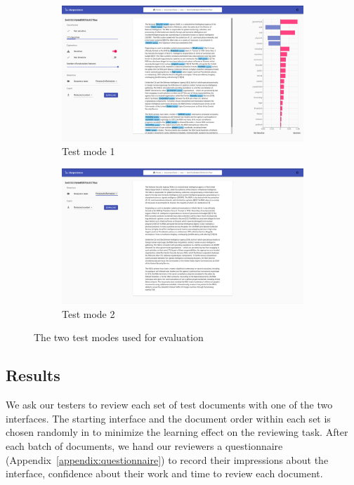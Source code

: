 \documentclass[\version]{l4proj}
\begin{document}
\begin{figure}[H]
    \centering
    \begin{subfigure}[c]{0.49\textwidth}
        \centering
        \includegraphics[width=\textwidth]{images/ui_test_mode_1.png}
        \caption{Test mode 1}\label{fig:test-mode-1}
    \end{subfigure}
    \begin{subfigure}[c]{0.49\textwidth}
        \centering
        \includegraphics[width=\textwidth]{images/ui_test_mode_2.png}
        \caption{Test mode 2}\label{fig:test-mode-2}
    \end{subfigure}
    \caption{The two test modes used for evaluation}\label{fig:test-modes}
\end{figure}


\subsection{Results}

We ask our testers to review each set of test documents with one of the two interfaces.
The starting interface and the document order within each set is chosen randomly in to minimize the learning effect on the reviewing task.
After each batch of documents, we hand our reviewers a questionnaire (Appendix~\ref{appendix:questionnaire}) to record their impressions about the interface, confidence about their work and time to review each document.
\end{document}
